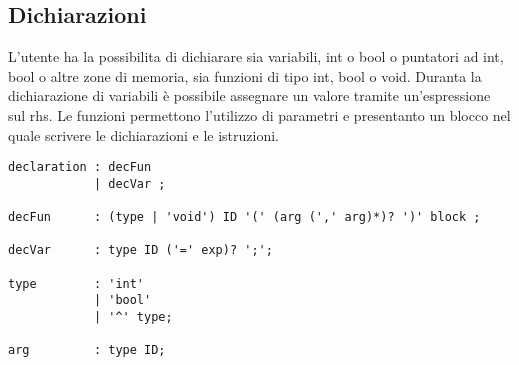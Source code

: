 \documentclass[../../main]{subfiles}
\begin{document}
\subsection{Dichiarazioni}\label{s:dichiarazioni}
L'utente ha la possibilita di dichiarare sia variabili, int o bool o puntatori ad int, bool o altre zone di memoria, sia funzioni di tipo int, bool o void.
Duranta la dichiarazione di variabili è possibile assegnare un valore tramite un'espressione sul rhs.
Le funzioni permettono l'utilizzo di parametri e presentanto un blocco nel quale scrivere le dichiarazioni e le istruzioni.
\begin{lstlisting}[style=antlr]
declaration : decFun    
            | decVar ;

decFun	    : (type | 'void') ID '(' (arg (',' arg)*)? ')' block ;

decVar      : type ID ('=' exp)? ';';

type        : 'int'
            | 'bool'
            | '^' type;

arg         : type ID;
\end{lstlisting}
\end{document}

